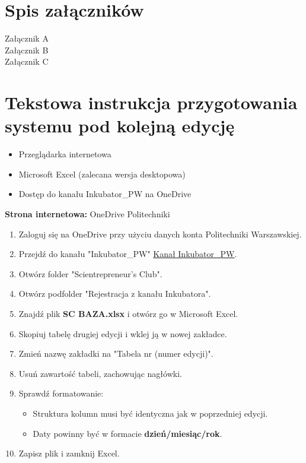 \chapter*{Spis załączników}

\appendix
\renewcommand{\chaptername}{Załącznik}

\begin{description}
  \item[Załącznik A] 
  \item[Załącznik B] 
  \item[Załącznik C] 
\end{description}

\chapter{Tekstowa instrukcja przygotowania systemu pod kolejną edycję}
\label{app:instrukcja}
\begin{itemize}
    \item Przeglądarka internetowa
    \item Microsoft Excel (zalecana wersja desktopowa)
    \item Dostęp do kanału Inkubator\_PW na OneDrive
\end{itemize}

\textbf{Strona internetowa:} OneDrive Politechniki
\begin{enumerate}
    \item Zaloguj się na OneDrive przy użyciu danych konta Politechniki Warszawskiej.
    \item Przejdź do kanału "Inkubator\_PW" \href{https://wutwaw.sharepoint.com/sites/Inkubator_PW/Shared%20Documents/Forms/AllItems.aspx}{Kanał Inkubator\_PW}.
    \item Otwórz folder "Scientrepreneur's Club".
    \item Otwórz podfolder "Rejestracja z kanału Inkubatora".
    \item Znajdź plik \textbf{SC BAZA.xlsx} i otwórz go w Microsoft Excel.
    \item Skopiuj tabelę drugiej edycji i wklej ją w nowej zakładce.
    \item Zmień nazwę zakładki na "Tabela nr (numer edycji)".
    \item Usuń zawartość tabeli, zachowując nagłówki.
    \item Sprawdź formatowanie:
    \begin{itemize}
        \item Struktura kolumn musi być identyczna jak w poprzedniej edycji.
        \item Daty powinny być w formacie \textbf{dzień/miesiąc/rok}.
    \end{itemize}
    \item Zapisz plik i zamknij Excel.
\end{enumerate}

